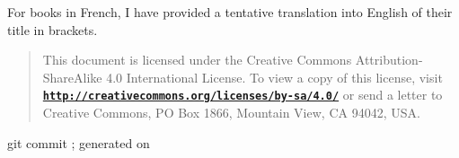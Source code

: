\documentclass[11pt,a4paper]{article}
\newcommand{\bmurl}[1]{{\href{#1}{\texttt{\textbf{#1}}}}}
\begin{document}


\begin{flushright}
  \begin{relsize}{-2}
    For books in French, I have provided a tentative translation into
    English of their title in brackets.
  \end{relsize}
\end{flushright}

\clearpage

\printindex

\medskip

\begin{quote}
{\footnotesize {} This document
is licensed under the Creative Commons Attribution-ShareAlike 4.0
International License. To view a copy of this license, visit
\bmurl{http://creativecommons.org/licenses/by-sa/4.0/} or send a letter to
Creative Commons, PO Box 1866, Mountain View, CA 94042, USA.}
\end{quote}

\begin{flushright}
  \begin{relsize}{-1}
    git commit \texttt{\bmgitcommit}; generated on \textit{\bmdoctimestamp}
  \end{relsize}
\end{flushright}
\end{document}
